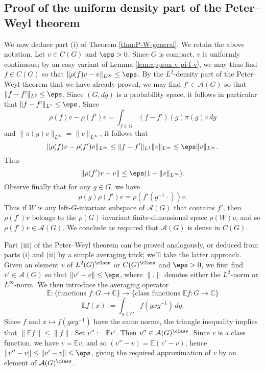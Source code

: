 \documentclass[reqno]{amsart} 
\begin{document}
\subsection{Proof of the uniform density part of the Peter--Weyl theorem}\label{sec:cnh2vot4d5}
We now deduce part (i) of Theorem \ref{thm:P-W-general}.  We retain the above notation.  Let $v \in C(G)$ and $\eps > 0$.  Since $G$ is compact, $v$ is uniformly continuous; by an easy variant of Lemma \ref{lem:approx-v-pi-f-v}, we may thus find $f \in C(G)$ so that $\|\rho(f) v - v\|_{L^\infty} \leq \eps$.  By the $L^2$-density part of the Peter--Weyl theorem that we have already proved, we may find $f' \in \mathcal{A}(G)$ so that $\|f - f'\|_{L^2} \leq \eps$.  Since $(G, d g)$ is a probability space, it follows in particular that $\|f - f'\|_{L^1} \leq \eps$.  Since
\begin{equation*}
  \rho(f) v - \rho(f') v = \int_{f \in G} (f - f')(g) \pi(g) v \, d g
\end{equation*}
and $\|\pi(g) v\|_{L^\infty} = \|v\|_{L^\infty}$, it follows that
\begin{equation*}
  \|\rho(f) v - \rho(f') v\|_{L^\infty} \leq \|f - f'\|_{L^1} \|v\|_{L^\infty} \leq \eps \|v\|_{L^\infty}.
\end{equation*}
Thus
\begin{equation*}
  \|\rho(f') v - v \| \leq \eps (1 + \|v\|_{L^\infty}).
\end{equation*}
Observe finally that for any $g \in G$, we have
\begin{equation*}
  \rho(g) \rho (f') v = \rho(f'(g^{-1} \cdot )) v.
\end{equation*}
Thus if $W$ is any left-$G$-invariant subspace of $\mathcal{A}(G)$ that contains $f'$, then $\rho (f') v$ belongs to the $\rho(G)$-invariant finite-dimensional space $\rho(W) v$, and so $\rho (f') v \in \mathcal{A}(G)$.  We conclude as required that $\mathcal{A}(G)$ is dense in $C(G)$.

Part (iii) of the Peter--Weyl theorem can be proved analogously, or deduced from parts (i) and (ii) by a simple averaging trick; we'll take the latter approach.  Given an element $v$ of $L^2(G)^{\class}$ or $C(G)^{\class}$ and $\eps > 0$, we first find $v' \in \mathcal{A}(G)$ so that $\|v' - v\| \leq \eps$, where $\|.\|$ denotes either the $L^2$-norm or $L^\infty$-norm.  We then introduce the averaging operator
\begin{equation*}
  \mathbb{E} : \{\text{functions }f: G \rightarrow \mathbb{C}\} \rightarrow \{\text{class functions } \mathbb{E} f: G \rightarrow \mathbb{C}\}
\end{equation*}
\begin{equation*}
  \mathbb{E} f(x) := \int_{g \in G} f(g x g^{-1}) \, d g.
\end{equation*}
Since $f$ and $x \mapsto f(g x g^{-1})$ have the same norms, the triangle inequality implies that $\|\mathbb{E} f\| \leq \|f\|$.  Set $v'' := \mathbb{E} v'$.  Then $v'' \in \mathcal{A}(G)^{\class}$.  Since $v$ is a class function, we have $v = \mathbb{E} v$, and so $(v'' - v) = \mathbb{E} (v' - v)$, hence $\|v'' - v\| \leq \|v' - v\| \leq \eps$, giving the required approximation of $v$ by an element of $\mathcal{A}(G)^{\class}$.
\end{document}
